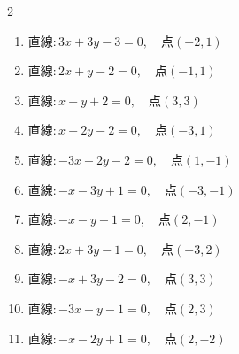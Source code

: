 \begin{multicols}{2}
\begin{enumerate}

  \item $直線:3x+3y-3=0,\quad 点 ( -2, 1 )$


  \item $直線:2x+y-2=0,\quad 点 ( -1, 1 )$


  \item $直線:x-y+2=0,\quad 点 ( 3, 3 )$


\columnbreak %

\resetques

  \item $直線:x-2y-2=0,\quad 点 ( -3, 1 )$


  \item $直線:-3x-2y-2=0,\quad 点 ( 1, -1 )$


  \item $直線:-x-3y+1=0,\quad 点 ( -3, -1 )$


  \item $直線:-x-y+1=0,\quad 点 ( 2, -1 )$

        \phantom{$\displaystyle 距離 : 0$}

  \item $直線:2x+3y-1=0,\quad 点 ( -3, 2 )$


  \item $直線:-x+3y-2=0,\quad 点 ( 3, 3 )$


  \item $直線:-3x+y-1=0,\quad 点 ( 2, 3 )$


  \item $直線:-x-2y+1=0,\quad 点 ( 2, -2 )$



\end{enumerate}
\end{multicols}
